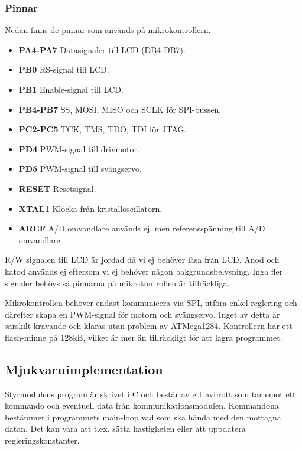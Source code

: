 \documentclass[tekniskrapport/tech.tex]{subfiles}
\begin{document}
\subsubsection{Pinnar}
Nedan finns de pinnar som används på mikrokontrollern.
\begin{itemize}
   \item \textbf{PA4-PA7} Datasignaler till LCD (DB4-DB7).
   \item \textbf{PB0} RS-signal till LCD.
   \item \textbf{PB1} Enable-signal till LCD.
   \item \textbf{PB4-PB7} SS, MOSI, MISO och SCLK för SPI-bussen.
   \item \textbf{PC2-PC5} TCK, TMS, TDO, TDI för JTAG.
   \item \textbf{PD4} PWM-signal till drivmotor.
   \item \textbf{PD5} PWM-signal till svängservo.
   \item \textbf{RESET} Resetsignal.
   \item \textbf{XTAL1} Klocka från kristalloscillatorn.
   \item \textbf{AREF} A/D omvandlare används ej, men referensspänning till A/D omvandlare.
\end{itemize}
R/W signalen till LCD är jordad då vi ej behöver läsa från LCD. Anod
och katod används ej eftersom vi ej behöver någon bakgrundsbelysning. Inga
fler signaler behövs så pinnarna på mikrokontrollen är tillräckliga.

Mikrokontrollen behöver endast kommunicera via SPI, utföra enkel reglering och
därefter skapa en PWM-signal för motorn och svängservo. Inget av detta är
särskilt krävande och klaras utan problem av ATMega1284. Kontrollern har
ett flash-minne på 128kB, vilket är mer än tillräckligt för att lagra
programmet.

\subsection{Mjukvaruimplementation} Styrmodulens program  är skrivet i C och
består av ett avbrott som tar emot ett kommando och eventuell data från
kommunikationsmodulen. Kommandona bestämmer i programmets main-loop vad som ska
hända med den mottagna datan. Det kan vara att t.ex. sätta hastigheten eller
att uppdatera regleringskonstanter. 
\end{document}
